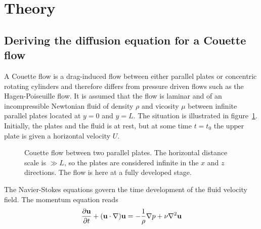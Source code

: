 \documentclass[aps,reprint]{revtex4-1}
\def\axislength{.5}
\begin{document}
\section{Theory} \label{sec:theory}
\subsection{Deriving the diffusion equation for a Couette flow}
A Couette flow is a drag-induced flow between either parallel plates or concentric
rotating cylinders and therefore differs from pressure driven flows such as the
Hagen-Poiseuille flow. It is assumed that the flow is laminar and of an incompressible
Newtonian fluid of density $\rho$ and vicosity $\mu$ between infinite parallel
plates located at $y = 0$ and $y = L$. The situation is illustrated in figure~\ref{fig:couette}.
Initially, the plates and the fluid is at rest, but at some time $t = t_0$
the upper plate is given a horizontal velocity $U$.
\begin{figure}[H]
  \centering
  \caption{Couette flow between two parallel plates. The horizontal distance
  scale is $\gg L$, so the plates are considered infinite in the $x$ and $z$
  directions. The flow is here at a fully developed stage.}
  \label{fig:couette}
\end{figure}
The Navier-Stokes equations govern the time development of the fluid velocity field.
The momentum equation reads
\begin{align*}
  \pdv{\vb{u}}{t} + (\vb{u} \cdot \nabla) \vb{u} = - \frac{1}{\rho} \nabla p + \nu \nabla^2 \vb{u}
\end{align*}
\end{document}

